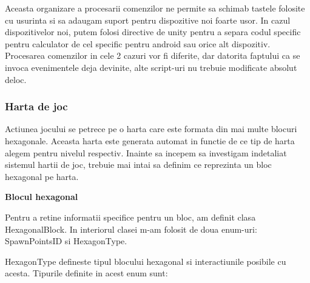 \documentclass[12pt, a4paper]{article}
\begin{document}
	Aceasta organizare a procesarii comenzilor ne permite sa schimab tastele folosite cu usurinta si sa adaugam suport pentru dispozitive noi foarte usor. In cazul dispozitivelor noi, putem folosi directive de unity pentru a separa codul specific pentru calculator de cel specific pentru android sau orice alt dispozitiv. Procesarea comenzilor in cele 2 cazuri vor fi diferite, dar datorita faptului ca se invoca evenimentele deja devinite, alte script-uri nu trebuie modificate absolut deloc.
	
	
	
	
	
	\subsubsection{Harta de joc}
	
	Actiunea jocului se petrece pe o harta care este formata din mai multe blocuri hexagonale. Aceasta harta este generata automat in functie de ce tip de harta alegem pentru nivelul respectiv. Inainte sa incepem sa investigam indetaliat sistemul hartii de joc, trebuie mai intai sa definim ce reprezinta un bloc hexagonal pe harta.
	\newline
	
	
	
	
	
	\textbf{Blocul hexagonal}
	
	Pentru a retine informatii specifice pentru un bloc, am definit clasa HexagonalBlock. In interiorul clasei m-am folosit de doua enum-uri: SpawnPointsID si HexagonType.
	\newline
	
	HexagonType defineste tipul blocului hexagonal si interactiunile posibile cu acesta. Tipurile definite in acest enum sunt:
	
\end{document}

